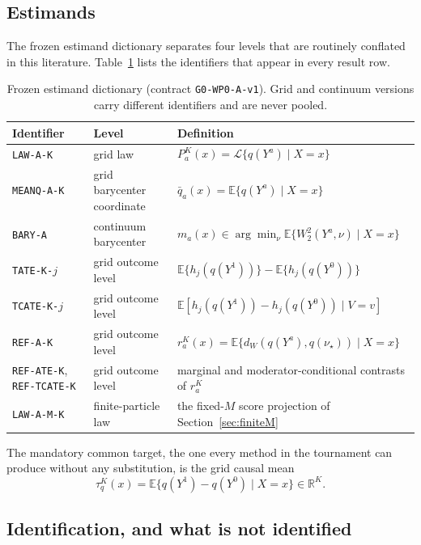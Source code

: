 \documentclass[11pt,a4paper]{article}
\theoremstyle{definition}
\theoremstyle{remark}
\newcommand{\Real}{\mathbb{R}}
\newcommand{\Exp}{\mathbb{E}}
\newcommand{\dW}{d_W}
\begin{document}
\subsection{Estimands}

The frozen estimand dictionary separates four levels that are routinely
conflated in this literature. Table~\ref{tab:estimands} lists the identifiers
that appear in every result row.

\begin{table}[htbp]
\centering
\caption{Frozen estimand dictionary (contract \texttt{G0-WP0-A-v1}). Grid and
continuum versions carry different identifiers and are never pooled.}
\label{tab:estimands}
\small
\begin{tabular}{@{}llp{7.3cm}@{}}
\toprule
Identifier & Level & Definition \\
\midrule
\texttt{LAW-A-K} & grid law & $P_a^K(x) = \mathcal{L}\{q(Y^a) \mid X = x\}$ \\
\texttt{MEANQ-A-K} & grid barycenter coordinate & $\bar q_a(x) = \Exp\{q(Y^a) \mid X=x\}$ \\
\texttt{BARY-A} & continuum barycenter & $m_a(x) \in \arg\min_\nu \Exp\{W_2^2(Y^a,\nu)\mid X=x\}$ \\
\texttt{TATE-K-}$j$ & grid outcome level & $\Exp\{h_j(q(Y^1))\} - \Exp\{h_j(q(Y^0))\}$ \\
\texttt{TCATE-K-}$j$ & grid outcome level & $\Exp[h_j(q(Y^1)) - h_j(q(Y^0)) \mid V = v]$ \\
\texttt{REF-A-K} & grid outcome level & $r_a^K(x) = \Exp\{\dW(q(Y^a), q(\nu_\star)) \mid X = x\}$ \\
\texttt{REF-ATE-K}, \texttt{REF-TCATE-K} & grid outcome level & marginal and moderator-conditional contrasts of $r_a^K$ \\
\texttt{LAW-A-M-K} & finite-particle law & the fixed-$M$ score projection of Section~\ref{sec:finiteM} \\
\bottomrule
\end{tabular}
\end{table}

The mandatory common target, the one every method in the tournament can produce
without any substitution, is the grid causal mean
\[
\tau_q^K(x) = \Exp\{q(Y^1) - q(Y^0) \mid X = x\} \in \Real^K .
\]

\subsection{Identification, and what is not identified}
\end{document}
